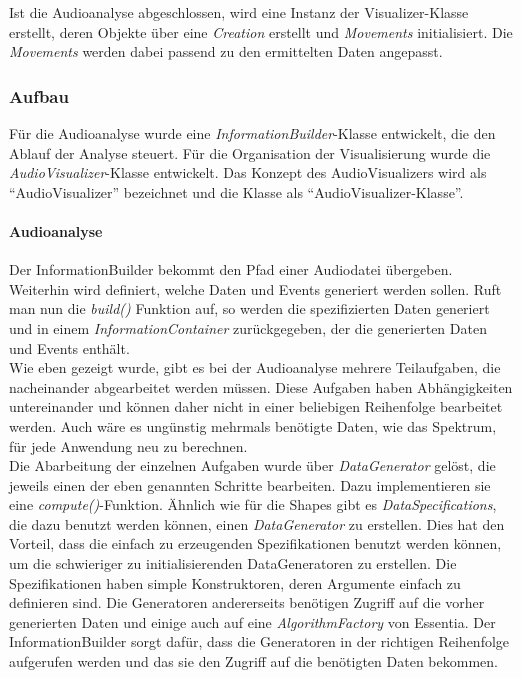 \documentclass[11pt,a4paper]{article}
\begin{document}
Ist die Audioanalyse abgeschlossen, wird eine Instanz der Visualizer-Klasse erstellt, deren Objekte über eine \textit{Creation} erstellt und \textit{Movements} initialisiert. Die \textit{Movements} werden dabei passend zu den ermittelten Daten angepasst.

\subsubsection{Aufbau}
Für die Audioanalyse wurde eine \textit{InformationBuilder}-Klasse entwickelt, die den Ablauf der Analyse steuert. Für die Organisation der Visualisierung wurde die \textit{AudioVisualizer}-Klasse entwickelt. Das Konzept des AudioVisualizers wird als ``AudioVisualizer'' bezeichnet und die Klasse als ``AudioVisualizer-Klasse''.

\paragraph{Audioanalyse}
Der InformationBuilder bekommt den Pfad einer Audiodatei übergeben. Weiterhin wird definiert, welche Daten und Events generiert werden sollen. Ruft man nun die \textit{build()} Funktion auf, so werden die spezifizierten Daten generiert und in einem \textit{InformationContainer} zurückgegeben, der die generierten Daten und Events enthält.\\
Wie eben gezeigt wurde, gibt es bei der Audioanalyse mehrere Teilaufgaben, die nacheinander abgearbeitet werden müssen. Diese Aufgaben haben Abhängigkeiten untereinander und können daher nicht in einer beliebigen Reihenfolge bearbeitet werden. Auch wäre es ungünstig mehrmals benötigte Daten, wie das Spektrum, für jede Anwendung neu zu berechnen.\\
Die Abarbeitung der einzelnen Aufgaben wurde über \textit{DataGenerator} gelöst, die jeweils einen der eben genannten Schritte bearbeiten. Dazu implementieren sie eine \textit{compute()}-Funktion. Ähnlich wie für die Shapes gibt es \textit{DataSpecifications}, die dazu benutzt werden können, einen \textit{DataGenerator} zu erstellen. Dies hat den Vorteil, dass die einfach zu erzeugenden Spezifikationen benutzt werden können, um die schwieriger zu initialisierenden DataGeneratoren zu erstellen. Die Spezifikationen haben simple Konstruktoren, deren Argumente einfach zu definieren sind. Die Generatoren andererseits benötigen Zugriff auf die vorher generierten Daten und einige auch auf eine \textit{AlgorithmFactory} von Essentia. Der InformationBuilder sorgt dafür, dass die Generatoren in der richtigen Reihenfolge aufgerufen werden und das sie den Zugriff auf die benötigten Daten bekommen.\\
\end{document}
